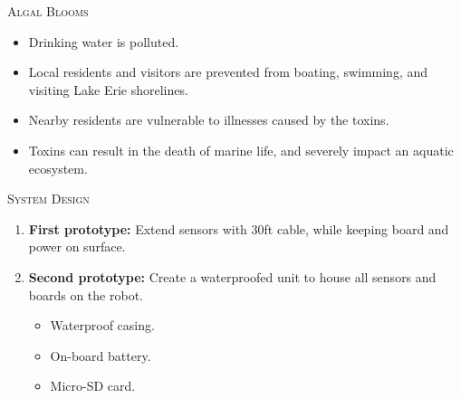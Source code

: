 \documentclass[final,t]{beamer}
\begin{document}
\begin{frame}{}
\begin{columns}
\begin{column}{.5\linewidth}
\begin{block}{\textsc{Algal Blooms}}
                \begin{itemize}
               		\item Drinking water is polluted.
					\item Local residents and visitors are prevented from boating, swimming, and visiting Lake Erie shorelines.
					\item Nearby residents are vulnerable to illnesses caused by the toxins. 
					\item Toxins can result in the death of marine life, and severely impact an aquatic ecosystem.
				\end{itemize}
                    \vspace*{6mm}
                \end{block}
                \begin{block}{\textsc{System Design}}
                    \vspace*{6mm}
                    
                    \begin{enumerate}
    	                \item \textbf{First prototype:}
                    	Extend sensors with 30ft cable, while keeping board and power on surface.
						\item \textbf{Second prototype:} Create a waterproofed unit to house all sensors and boards on the robot.
						\begin{itemize}		
							\item Waterproof casing.
							\item On-board battery.
							\item Micro-SD card.
						\end{itemize}
					\end{enumerate}
					


\end{block}
\end{column}
\end{columns}
\end{frame}
\end{document}
